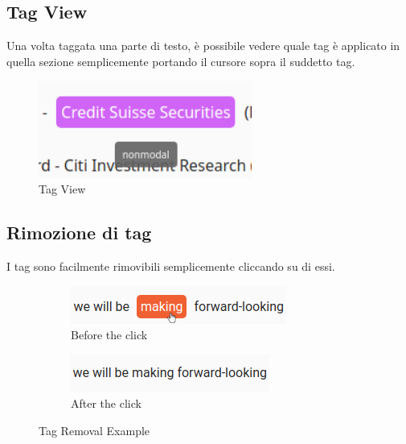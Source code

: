 \documentclass[twoside]{supsistudent}
\begin{document}
\subsection{Tag View}

Una volta taggata una parte di testo, è possibile vedere quale tag è applicato
in quella sezione semplicemente portando il cursore sopra il suddetto tag.

\begin{figure}[h!]
  \centering
  \includegraphics[width=7cm]{figures/tagview.png}
  \caption{Tag View}\label{fig:tagView}
\end{figure}

\subsection{Rimozione di tag}

I tag sono facilmente rimovibili semplicemente cliccando su di essi.

\begin{figure}[h!]
  \centering
  \begin{subfigure}[b]{0.4\linewidth}
    \includegraphics[width=\linewidth]{figures/tagRemoval1.png}
    \caption{Before the click}
  \end{subfigure}
  \begin{subfigure}[b]{0.4\linewidth}
    \includegraphics[width=\linewidth]{figures/tagRemoval2.png}
    \caption{After the click}
  \end{subfigure}
  \caption{Tag Removal Example}
  \label{fig:tagRemoval}
\end{figure}
\end{document}
